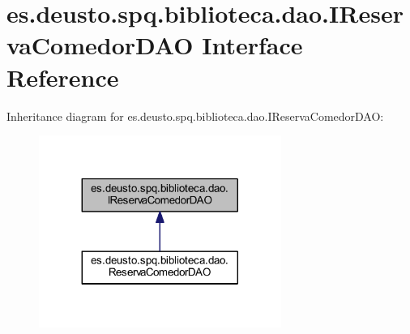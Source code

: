\hypertarget{interfacees_1_1deusto_1_1spq_1_1biblioteca_1_1dao_1_1_i_reserva_comedor_d_a_o}{}\section{es.\+deusto.\+spq.\+biblioteca.\+dao.\+I\+Reserva\+Comedor\+D\+AO Interface Reference}
\label{interfacees_1_1deusto_1_1spq_1_1biblioteca_1_1dao_1_1_i_reserva_comedor_d_a_o}


Inheritance diagram for es.\+deusto.\+spq.\+biblioteca.\+dao.\+I\+Reserva\+Comedor\+D\+AO\+:
\nopagebreak
\begin{figure}[H]
\begin{center}
\leavevmode
\includegraphics[width=224pt]{interfacees_1_1deusto_1_1spq_1_1biblioteca_1_1dao_1_1_i_reserva_comedor_d_a_o__inherit__graph}
\end{center}
\end{figure}
